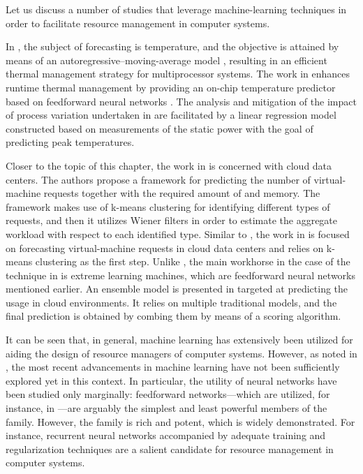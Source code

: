 Let us discuss a number of studies that leverage machine-learning techniques in
order to facilitate resource management in computer systems.

In \cite{coskun2008}, the subject of forecasting is temperature, and the
objective is attained by means of an autoregressive--moving-average model
\cite{hastie2013}, resulting in an efficient thermal management strategy for
multiprocessor systems. The work in \cite{kumar2010} enhances runtime thermal
management by providing an on-chip temperature predictor based on feedforward
neural networks \cite{hastie2013}. The analysis and mitigation of the impact of
process variation undertaken in \cite{juan2014} are facilitated by a linear
regression model \cite{hastie2013} constructed based on measurements of the
static power with the goal of predicting peak temperatures.

Closer to the topic of this chapter, the work in \cite{dabbagh2015} is concerned
with cloud data centers. The authors propose a framework for predicting the
number of virtual-machine requests together with the required amount of 
and memory. The framework makes use of k-means clustering \cite{hastie2013} for
identifying different types of requests, and then it utilizes Wiener filters in
order to estimate the aggregate workload with respect to each identified type.
Similar to \cite{dabbagh2015}, the work in \cite{ismaeel2015} is focused on
forecasting virtual-machine requests in cloud data centers and relies on k-means
clustering as the first step. Unlike \cite{dabbagh2015}, the main workhorse in
the case of the technique in \cite{ismaeel2015} is extreme learning machines,
which are feedforward neural networks mentioned earlier. An ensemble model
\cite{hastie2013} is presented in \cite{cao2014} targeted at predicting the
 usage in cloud environments. It relies on multiple traditional models,
and the final prediction is obtained by combing them by means of a scoring
algorithm.

It can be seen that, in general, machine learning has extensively been utilized
for aiding the design of resource managers of computer systems. However, as
noted in , the most recent advancements in machine
learning have not been sufficiently explored yet in this context. In particular,
the utility of neural networks have been studied only marginally: feedforward
networks---which are utilized, for instance, in \cite{kumar2010,
ismaeel2015}---are arguably the simplest and least powerful members of the
family. However, the family is rich and potent, which is widely demonstrated.
For instance, recurrent neural networks accompanied by adequate training and
regularization techniques \cite{goodfellow2016} are a salient candidate for
resource management in computer systems.

